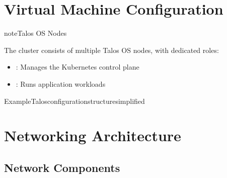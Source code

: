 \documentclass[letterpaper,10pt,english]{sphinxmanual}
\begin{document}
\section{Virtual Machine Configuration}
\label{\detokenize{SDA:virtual-machine-configuration}}
\begin{sphinxadmonition}{note}{Talos OS Nodes}

\sphinxAtStartPar
The cluster consists of multiple Talos OS nodes, with dedicated roles:
\begin{itemize}
\item {} 
\sphinxAtStartPar
{}: Manages the Kubernetes control plane

\item {} 
\sphinxAtStartPar
{}: Runs application workloads

\end{itemize}
\end{sphinxadmonition}

\begin{sphinxVerbatim}[commandchars=\\\{\}]
ExampleTalosconfigurationstructuresimplified
\end{sphinxVerbatim}


\section{Networking Architecture}
\label{\detokenize{SDA:networking-architecture}}

\subsection{Network Components}
\label{\detokenize{SDA:network-components}}
\end{document}
